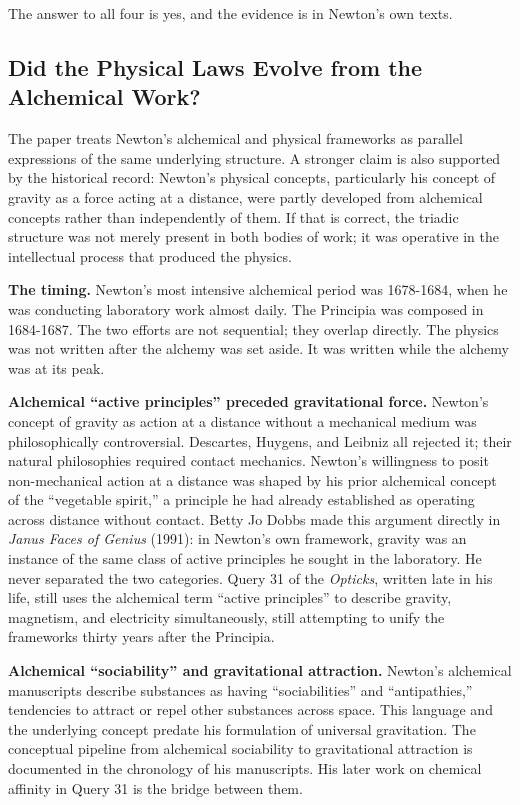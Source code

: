 \documentclass[12pt]{article}
\begin{document}
The answer to all four is yes, and the evidence is in Newton's own
texts.

\subsection{Did the Physical Laws Evolve from the Alchemical Work?}\label{did-the-physical-laws-evolve-from-the-alchemical-work}

The paper treats Newton's alchemical and physical frameworks as parallel
expressions of the same underlying structure. A stronger claim is also
supported by the historical record: Newton's physical concepts,
particularly his concept of gravity as a force acting at a distance,
were partly developed from alchemical concepts rather than independently
of them. If that is correct, the triadic structure was not merely
present in both bodies of work; it was operative in the intellectual
process that produced the physics.

\textbf{The timing.} Newton's most intensive alchemical period was
1678-1684, when he was conducting laboratory work almost daily. The
Principia was composed in 1684-1687. The two efforts are not sequential;
they overlap directly. The physics was not written after the alchemy was
set aside. It was written while the alchemy was at its peak.

\textbf{Alchemical ``active principles'' preceded gravitational force.}
Newton's concept of gravity as action at a distance without a mechanical
medium was philosophically controversial. Descartes, Huygens, and
Leibniz all rejected it; their natural philosophies required contact
mechanics. Newton's willingness to posit non-mechanical action at a
distance was shaped by his prior alchemical concept of the ``vegetable
spirit,'' a principle he had already established as operating across
distance without contact. Betty Jo Dobbs made this argument directly in
\emph{Janus Faces of Genius} (1991): in Newton's own framework, gravity
was an instance of the same class of active principles he sought in the
laboratory. He never separated the two categories. Query 31 of the
\emph{Opticks}, written late in his life, still uses the alchemical term
``active principles'' to describe gravity, magnetism, and electricity
simultaneously, still attempting to unify the frameworks thirty years
after the Principia.

\textbf{Alchemical ``sociability'' and gravitational attraction.}
Newton's alchemical manuscripts describe substances as having
``sociabilities'' and ``antipathies,'' tendencies to attract or repel
other substances across space. This language and the underlying concept
predate his formulation of universal gravitation. The conceptual
pipeline from alchemical sociability to gravitational attraction is
documented in the chronology of his manuscripts. His later work on
chemical affinity in Query 31 is the bridge between them.
\end{document}
